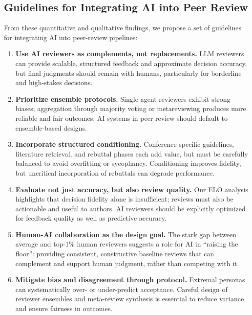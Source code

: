 \documentclass{article} %
\newcommand{\shrink}[1][0.5]{\vspace{-#1\baselineskip}}
\begin{document}
\subsection{Guidelines for Integrating AI into Peer Review} \shrink[0.75]

From these quantitative and qualitative findings, we propose a set of guidelines for integrating AI into peer-review pipelines:

\begin{enumerate}[leftmargin=*]
    \item \textbf{Use AI reviewers as complements, not replacements.} LLM reviewers can provide scalable, structured feedback and approximate decision accuracy, but final judgments should remain with humans, particularly for borderline and high-stakes decisions.
    \item \textbf{Prioritize ensemble protocols.} Single-agent reviewers exhibit strong biases; aggregation through majority voting or metareviewing produces more reliable and fair outcomes. AI systems in peer review should default to ensemble-based designs.
    \item \textbf{Incorporate structured conditioning.} Conference-specific guidelines, literature retrieval, and rebuttal phases each add value, but must be carefully balanced to avoid overfitting or sycophancy. Conditioning improves fidelity, but uncritical incorporation of rebuttals can degrade performance.
    \item \textbf{Evaluate not just accuracy, but also review quality.} Our ELO analysis highlights that decision fidelity alone is insufficient; reviews must also be actionable and useful to authors. AI reviewers should be explicitly optimized for feedback quality as well as predictive accuracy.
    \item \textbf{Human-AI collaboration as the design goal.} The stark gap between average and top-1\% human reviewers suggests a role for AI in ``raising the floor'': providing consistent, constructive baseline reviews that can complement and support human judgment, rather than competing with it.
    \item \textbf{Mitigate bias and disagreement through protocol.} Extremal personas can systematically over- or under-predict acceptance. Careful design of reviewer ensembles and meta-review synthesis is essential to reduce variance and ensure fairness in outcomes.
\end{enumerate}
\end{document}
